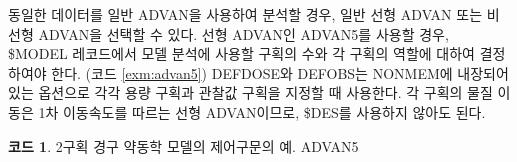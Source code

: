 \documentclass[
  11pt,
  krantz2,
  a4paper]{krantz}
\newenvironment{Shaded}{\begin{snugshade}}{\end{snugshade}}
\newcommand{\DecValTok}[1]{\textcolor[rgb]{0.00,0.00,0.81}{#1}}
\newcommand{\FloatTok}[1]{\textcolor[rgb]{0.00,0.00,0.81}{#1}}
\newcommand{\NormalTok}[1]{#1}
\newcommand{\OperatorTok}[1]{\textcolor[rgb]{0.81,0.36,0.00}{\textbf{#1}}}
\theoremstyle{definition}
\theoremstyle{definition}
\newtheorem{example}{코드}[chapter]
\theoremstyle{definition}
\theoremstyle{remark}
\begin{document}
\begin{Shaded}
\end{Shaded}

동일한 데이터를 일반 ADVAN을 사용하여 분석할 경우, 일반 선형 ADVAN 또는 비선형 ADVAN을 선택할 수 있다. 선형 ADVAN인 ADVAN5를 사용할 경우, \$MODEL 레코드에서 모델 분석에 사용할 구획의 수와 각 구획의 역할에 대하여 결정하여야 한다. (코드 \ref{exm:advan5}) DEFDOSE와 DEFOBS는 NONMEM에 내장되어 있는 옵션으로 각각 용량 구획과 관찰값 구획을 지정할 때 사용한다. 각 구획의 물질 이동은 1차 이동속도를 따르는 선형 ADVAN이므로, \$DES를 사용하지 않아도 된다.

\begin{example}
\protect\hypertarget{exm:advan5}{}{\label{exm:advan5} }2구획 경구 약동학 모델의 제어구문의 예. ADVAN5
\end{example}
\end{document}
